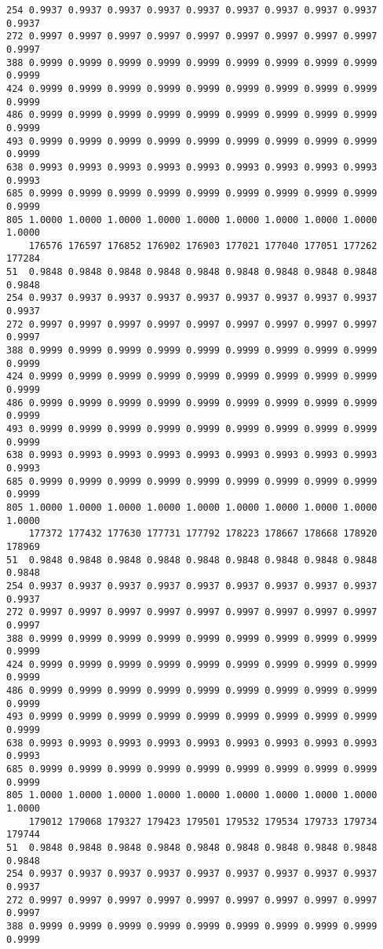 \documentclass[
]{report}
\begin{document}
\begin{verbatim}
254 0.9937 0.9937 0.9937 0.9937 0.9937 0.9937 0.9937 0.9937 0.9937 0.9937
272 0.9997 0.9997 0.9997 0.9997 0.9997 0.9997 0.9997 0.9997 0.9997 0.9997
388 0.9999 0.9999 0.9999 0.9999 0.9999 0.9999 0.9999 0.9999 0.9999 0.9999
424 0.9999 0.9999 0.9999 0.9999 0.9999 0.9999 0.9999 0.9999 0.9999 0.9999
486 0.9999 0.9999 0.9999 0.9999 0.9999 0.9999 0.9999 0.9999 0.9999 0.9999
493 0.9999 0.9999 0.9999 0.9999 0.9999 0.9999 0.9999 0.9999 0.9999 0.9999
638 0.9993 0.9993 0.9993 0.9993 0.9993 0.9993 0.9993 0.9993 0.9993 0.9993
685 0.9999 0.9999 0.9999 0.9999 0.9999 0.9999 0.9999 0.9999 0.9999 0.9999
805 1.0000 1.0000 1.0000 1.0000 1.0000 1.0000 1.0000 1.0000 1.0000 1.0000
    176576 176597 176852 176902 176903 177021 177040 177051 177262 177284
51  0.9848 0.9848 0.9848 0.9848 0.9848 0.9848 0.9848 0.9848 0.9848 0.9848
254 0.9937 0.9937 0.9937 0.9937 0.9937 0.9937 0.9937 0.9937 0.9937 0.9937
272 0.9997 0.9997 0.9997 0.9997 0.9997 0.9997 0.9997 0.9997 0.9997 0.9997
388 0.9999 0.9999 0.9999 0.9999 0.9999 0.9999 0.9999 0.9999 0.9999 0.9999
424 0.9999 0.9999 0.9999 0.9999 0.9999 0.9999 0.9999 0.9999 0.9999 0.9999
486 0.9999 0.9999 0.9999 0.9999 0.9999 0.9999 0.9999 0.9999 0.9999 0.9999
493 0.9999 0.9999 0.9999 0.9999 0.9999 0.9999 0.9999 0.9999 0.9999 0.9999
638 0.9993 0.9993 0.9993 0.9993 0.9993 0.9993 0.9993 0.9993 0.9993 0.9993
685 0.9999 0.9999 0.9999 0.9999 0.9999 0.9999 0.9999 0.9999 0.9999 0.9999
805 1.0000 1.0000 1.0000 1.0000 1.0000 1.0000 1.0000 1.0000 1.0000 1.0000
    177372 177432 177630 177731 177792 178223 178667 178668 178920 178969
51  0.9848 0.9848 0.9848 0.9848 0.9848 0.9848 0.9848 0.9848 0.9848 0.9848
254 0.9937 0.9937 0.9937 0.9937 0.9937 0.9937 0.9937 0.9937 0.9937 0.9937
272 0.9997 0.9997 0.9997 0.9997 0.9997 0.9997 0.9997 0.9997 0.9997 0.9997
388 0.9999 0.9999 0.9999 0.9999 0.9999 0.9999 0.9999 0.9999 0.9999 0.9999
424 0.9999 0.9999 0.9999 0.9999 0.9999 0.9999 0.9999 0.9999 0.9999 0.9999
486 0.9999 0.9999 0.9999 0.9999 0.9999 0.9999 0.9999 0.9999 0.9999 0.9999
493 0.9999 0.9999 0.9999 0.9999 0.9999 0.9999 0.9999 0.9999 0.9999 0.9999
638 0.9993 0.9993 0.9993 0.9993 0.9993 0.9993 0.9993 0.9993 0.9993 0.9993
685 0.9999 0.9999 0.9999 0.9999 0.9999 0.9999 0.9999 0.9999 0.9999 0.9999
805 1.0000 1.0000 1.0000 1.0000 1.0000 1.0000 1.0000 1.0000 1.0000 1.0000
    179012 179068 179327 179423 179501 179532 179534 179733 179734 179744
51  0.9848 0.9848 0.9848 0.9848 0.9848 0.9848 0.9848 0.9848 0.9848 0.9848
254 0.9937 0.9937 0.9937 0.9937 0.9937 0.9937 0.9937 0.9937 0.9937 0.9937
272 0.9997 0.9997 0.9997 0.9997 0.9997 0.9997 0.9997 0.9997 0.9997 0.9997
388 0.9999 0.9999 0.9999 0.9999 0.9999 0.9999 0.9999 0.9999 0.9999 0.9999

\end{verbatim}
\end{document}
